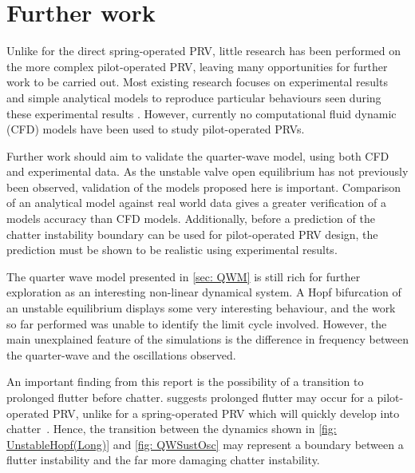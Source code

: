 \chapter{Further work}

Unlike for the direct spring-operated PRV, little research has been performed on the more complex pilot-operated PRV, leaving many opportunities for further work to be carried out. Most existing research focuses on experimental results and simple analytical models to reproduce particular behaviours seen during these experimental results \cite{Botros1997Riser-ReliefInteractions,Zung2002NonlinearDesigners,Ye2009DynamicSystem,Allison2015TestingValves}. However, currently no computational fluid dynamic (CFD) models have been used to study pilot-operated PRVs.

Further work should aim to validate the quarter-wave model, using both CFD and experimental data. As the unstable valve open equilibrium has not previously been observed, validation of the models proposed here is important.
Comparison of an analytical model against real world data gives a greater verification of a models accuracy than CFD models. Additionally, before a prediction of the chatter instability boundary can be used for pilot-operated PRV design, the prediction must be shown to be realistic using experimental results.

The quarter wave model presented in \cref{sec: QWM} is still rich for further exploration as an interesting non-linear dynamical system. A Hopf bifurcation of an unstable equilibrium displays some very interesting behaviour, and the work so far performed was unable to identify the limit cycle involved. However, the main unexplained feature of the simulations is the difference in frequency between the quarter-wave and the oscillations observed.

An important finding from this report is the possibility of a transition to prolonged flutter before chatter.  suggests prolonged flutter may occur for a pilot-operated PRV, unlike for a spring-operated PRV which will quickly develop into chatter~\cite{Hos2016DynamicService}. Hence, the transition between the dynamics shown in \cref{fig: UnstableHopf(Long)} and \cref{fig: QWSustOsc} may represent a boundary between a flutter instability and the far more damaging chatter instability.

